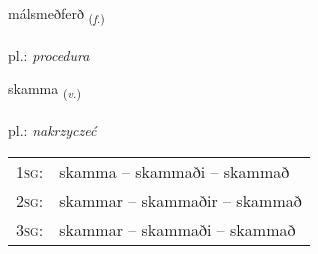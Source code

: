 \documentclass[frontgrid, backgrid]{flacards}\usepackage[]{graphicx}\usepackage[]{xcolor}
\begin{document}
\renewcommand{\flhead}{\vskip5pt \fboxsep=0pt {\small\bfseries\footnotesize Nafnorð | rzeczownik}}
\renewcommand{\fcfoot}{\vskip5pt \fboxsep=0pt \hspace{2pt}{\small\bfseries\footnotesize 3K}}

\renewcommand{\blhead}{\vskip5pt {\small\bfseries\footnotesize Nafnorð | rzeczownik }}
\renewcommand{\bcfoot}{\vskip5pt \hspace{2pt}{\small\bfseries\footnotesize 3K}}


{málsmeðferð \small{\textsubscript{(\textit{f.})}} \\[1ex] %
\textphonetic{[maulsmɛðfɛrð]} \\
pl.: \emph{procedura} \\  [2ex]
\renewcommand*{\arraystretch}{0.8}
}

\renewcommand{\flhead}{\vskip5pt \fboxsep=0pt {\small\bfseries\footnotesize Sagnorð | czasownik}}
\renewcommand{\fcfoot}{\vskip5pt \fboxsep=0pt \hspace{2pt}{\small\bfseries\footnotesize 3K}}

\renewcommand{\blhead}{\vskip5pt {\small\bfseries\footnotesize Sagnorð | czasownik }}
\renewcommand{\bcfoot}{\vskip5pt \hspace{2pt}{\small\bfseries\footnotesize 3K}}


{skamma \small{\textsubscript{(\textit{v.})}} \\[1ex] %
\textphonetic{[skama]} \\
pl.: \emph{nakrzyczeć} \\  [2ex]
\renewcommand*{\arraystretch}{0.8}
\begin{tabular}{p{1cm}l}
\textsc{1sg}: & skamma -- skammaði -- skammað \\ 
\textsc{2sg}: & skammar -- skammaðir -- skammað \\ 
\textsc{3sg}: & skammar -- skammaði -- skammað \\ 
\end{tabular}
}
\end{document}
